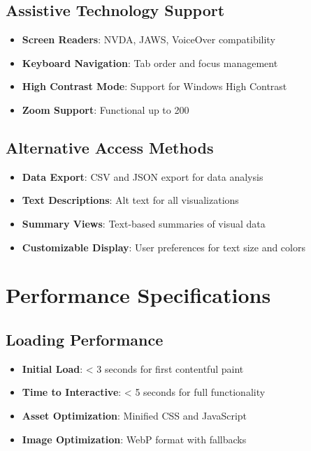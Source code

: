 \subsection{Assistive Technology Support}
\begin{itemize}
\item \textbf{Screen Readers}: NVDA, JAWS, VoiceOver compatibility
\item \textbf{Keyboard Navigation}: Tab order and focus management
\item \textbf{High Contrast Mode}: Support for Windows High Contrast
\item \textbf{Zoom Support}: Functional up to 200%
\end{itemize}

\subsection{Alternative Access Methods}
\begin{itemize}
\item \textbf{Data Export}: CSV and JSON export for data analysis
\item \textbf{Text Descriptions}: Alt text for all visualizations
\item \textbf{Summary Views}: Text-based summaries of visual data
\item \textbf{Customizable Display}: User preferences for text size and colors
\end{itemize}


\section{Performance Specifications}

\subsection{Loading Performance}
\begin{itemize}
\item \textbf{Initial Load}: < 3 seconds for first contentful paint
\item \textbf{Time to Interactive}: < 5 seconds for full functionality
\item \textbf{Asset Optimization}: Minified CSS and JavaScript
\item \textbf{Image Optimization}: WebP format with fallbacks
\end{itemize}

